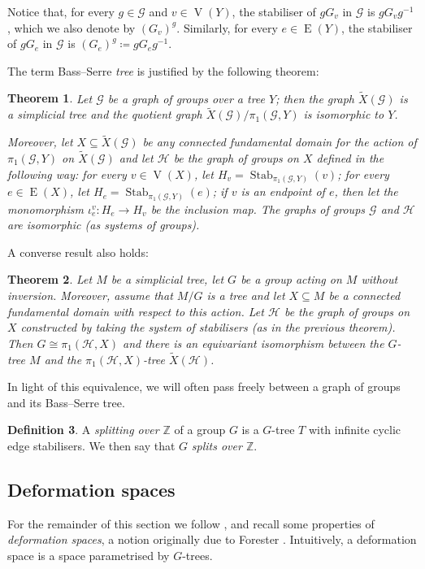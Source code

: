 \documentclass[svgnames]{amsart}
\theoremstyle{plain}
\newtheorem{thm}{Theorem}[section]
\theoremstyle{definition}
\newtheorem{defn}[thm]{Definition}
\newcommand{\Z}{\mathbb{Z}}
\newcommand{\edge}[1]{\operatorname{E}(#1)}
\newcommand{\Stab}[2]{\operatorname{Stab}_{#1}\left(#2\right)}
\newcommand{\ver}[1]{\operatorname{V}(#1)}
\begin{document}
\noindent Notice that, for every $g\in \mathcal G$ and $v\in \ver Y$, the stabiliser of $gG_v$ in $\mathcal G$ is $gG_vg^{-1}$, which we also denote by $(G_v)^g$. Similarly, for every $e\in \edge Y$, the stabiliser of $gG_e$ in $\mathcal G$ is $(G_e)^g\coloneq gG_eg^{-1}$.

The term Bass--Serre \emph{tree} is justified by the following theorem:

\begin{thm}
    Let $\mathcal G$ be a graph of groups over a tree $Y$; then the graph $\tilde X(\mathcal G)$ is a simplicial tree and the quotient graph $\tilde X(\mathcal G)/\pi_1(\mathcal G,Y)$ is isomorphic to $Y$. \par 
    Moreover, let $X\subseteq \tilde X(\mathcal G)$ be any connected fundamental domain for the action of $\pi_1(\mathcal G,Y)$ on $\tilde X(\mathcal G)$ and let $\mathcal H$ be the graph of groups on $X$ defined in the following way: for every $v\in\ver X$, let $H_v=\Stab{\pi_1(\mathcal G,Y)}{v}$; for every $e\in\edge X$, let $H_e=\Stab{\pi_1(\mathcal G,Y)}{e}$; if $v$ is an endpoint of $e$, then let the monomorphism $\iota_e^v\colon H_e\to H_v$ be the inclusion map. The graphs of groups $\mathcal G$ and $\mathcal H$ are isomorphic (as systems of groups).
\end{thm}

\noindent A converse result also holds:

\begin{thm}
    Let $M$ be a simplicial tree, let $G$ be a group acting on $M$ without inversion. Moreover, assume that $M/G$ is a tree and let $X\subseteq M$ be a connected fundamental domain with respect to this action. Let $\mathcal H$ be the graph of groups on~$X$ constructed by taking the system of stabilisers (as in the previous theorem). Then $G\cong\pi_1(\mathcal H,X)$ and there is an equivariant isomorphism between the $G$-tree $M$ and the $\pi_1(\mathcal H,X)$-tree $\tilde X(\mathcal H)$.
\end{thm}

\noindent In light of this equivalence, we will often pass freely between a graph of groups and its Bass--Serre tree. 



\begin{defn}\label{def_splitoverZ}
    A \emph{splitting over $\Z$} of a group $G$ is a $G$-tree $T$ with infinite cyclic edge stabilisers. We then say that $G$ \emph{splits over $\Z$}.
\end{defn}
\subsection{Deformation spaces}
For the remainder of this section we follow \cite{GL_def_trees}, and recall some properties of \emph{deformation spaces}, a notion originally due to Forester \cite{forester}. Intuitively, a deformation space is a space parametrised by $G$-trees.
\end{document}
